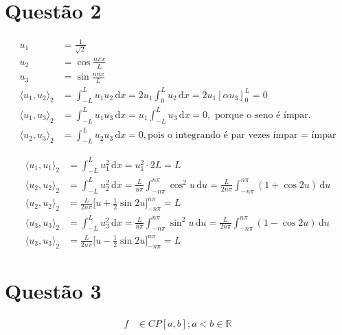 \documentclass[12pt,a4paper]{article}
\begin{document}
		\begin{flushright}
		\end{flushright}

	\section{Quest\~ao 2}

		\begin{align}
			u_1 &= \frac{1}{\sqrt{2}} \\
			u_2 &= \cos \frac{n \pi x}{L} \\
			u_3 &= \sin \frac{n \pi x}{L} \\
			\langle u_1, u_2 \rangle_2 &= \int_{-L}^L u_1 u_2 \,\mathrm{d}x = 2 u_1 \int_0^L u_2 \,\mathrm{d}x = 2 u_1 [\alpha u_3]_0^L = 0 \\
			\langle u_1, u_3 \rangle_2 &= \int_{-L}^L u_1 u_3 \,\mathrm{d}x = u_1 \int_{-L}^L u_3 \,\mathrm{d}x = 0, \text{ porque o seno \'e \'impar.} \\
			\langle u_2, u_3 \rangle_2 &= \int_{-L}^L u_2 u_3 \,\mathrm{d}x = 0, \text{pois o integrando \'e par vezes \'impar = \'impar}
		\end{align}

		\begin{align}
			\langle u_1, u_1 \rangle_2 &= \int_{-L}^L u_1^2 \,\mathrm{d}x = u_1^2 \cdot 2L = L \\
			\langle u_2, u_2 \rangle_2 &= \int_{-L}^L u_2^2 \,\mathrm{d}x = \frac{L}{n\pi} \int_{-n\pi}^{n\pi} \cos^2 u\,\mathrm{d}u = \frac{L}{2n\pi} \int_{-n\pi}^{n\pi} (1 + \cos 2u)\,\mathrm{d}u \\
			\langle u_2, u_2 \rangle_2 &= \frac{L}{2n\pi} \bigg[u + \frac{1}{2}\sin 2u\bigg]_{-n\pi}^{n\pi} = L \\
			\langle u_3, u_3 \rangle_2 &= \int_{-L}^L u_3^2 \,\mathrm{d}x = \frac{L}{n\pi} \int_{-n\pi}^{n\pi} \sin^2 u\,\mathrm{d}u = \frac{L}{2n\pi} \int_{-n\pi}^{n\pi} (1 - \cos 2u)\,\mathrm{d}u \\
			\langle u_3, u_3 \rangle_2 &= \frac{L}{2n\pi} \bigg[u - \frac{1}{2}\sin 2u\bigg]_{-n\pi}^{n\pi} = L
		\end{align}

	\section{Quest\~ao 3}

		\begin{align}
			f &\in CP[a,b] ; a < b \in \mathbb{R}
		\end{align}
\end{document}
